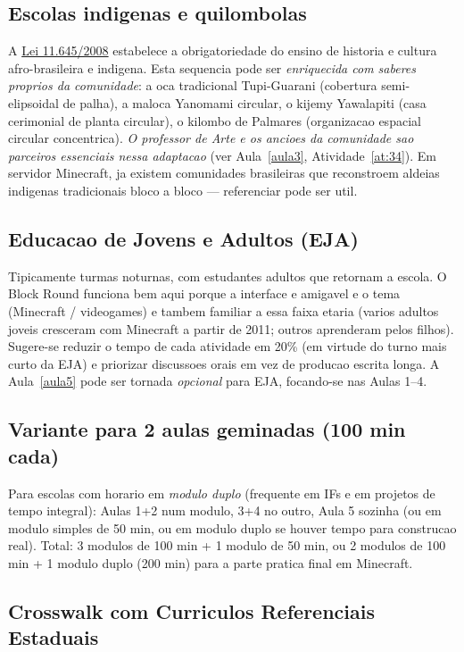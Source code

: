 \documentclass[12pt,a4paper]{scrartcl}
\begin{document}
\subsection{Escolas indigenas e quilombolas}
A \href{https://www.planalto.gov.br/ccivil_03/_ato2007-2010/2008/lei/l11645.htm}{Lei 11.645/2008} estabelece a obrigatoriedade do ensino de historia e cultura afro-brasileira e indigena. Esta sequencia pode ser \emph{enriquecida com saberes proprios da comunidade}: a oca tradicional Tupi-Guarani (cobertura semi-elipsoidal de palha), a maloca Yanomami circular, o kijemy Yawalapiti (casa cerimonial de planta circular), o kilombo de Palmares (organizacao espacial circular concentrica). \emph{O professor de Arte e os ancioes da comunidade sao parceiros essenciais nessa adaptacao} (ver Aula~\ref{aula3}, Atividade~\ref{at:34}). Em servidor Minecraft, ja existem comunidades brasileiras que reconstroem aldeias indigenas tradicionais bloco a bloco --- referenciar pode ser util.

\subsection{Educacao de Jovens e Adultos (EJA)}
Tipicamente turmas noturnas, com estudantes adultos que retornam a escola. O Block Round funciona bem aqui porque a interface e amigavel e o tema (Minecraft / videogames) e tambem familiar a essa faixa etaria (varios adultos joveis cresceram com Minecraft a partir de 2011; outros aprenderam pelos filhos). Sugere-se reduzir o tempo de cada atividade em 20\% (em virtude do turno mais curto da EJA) e priorizar discussoes orais em vez de producao escrita longa. A Aula~\ref{aula5} pode ser tornada \emph{opcional} para EJA, focando-se nas Aulas 1--4.

\subsection{Variante para 2 aulas geminadas (100 min cada)}
Para escolas com horario em \emph{modulo duplo} (frequente em IFs e em projetos de tempo integral): Aulas 1+2 num modulo, 3+4 no outro, Aula 5 sozinha (ou em modulo simples de 50 min, ou em modulo duplo se houver tempo para construcao real). Total: 3 modulos de 100 min + 1 modulo de 50 min, ou 2 modulos de 100 min + 1 modulo duplo (200 min) para a parte pratica final em Minecraft.

\subsection{Crosswalk com Curriculos Referenciais Estaduais}
\end{document}
